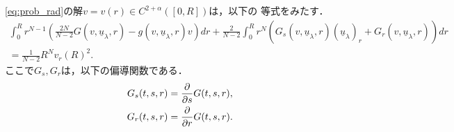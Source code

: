 \begin{lem}
 \eqref{eq:prob_rad}の解$v = v(r) \in C^{2+\alpha}([0, R])$は，以下の
 等式をみたす．
 \begin{multline}
  \int_0^R r^{N-1} \left( \frac{2N}{N-2} G(v, \underline{u}_\lambda,
  r) - g(v, \underline{u}_\lambda, r) v \right) dr
  + \frac{2}{N-2} \int_0^R r^N \left( G_s(v, \underline{u}_\lambda, r)
  (\underline{u}_\lambda)_r + G_r(v, \underline{u}_\lambda, r)
  \right) dr \\ = \frac{1}{N-2} R^N v_r(R)^2. \label{eq:poh_eq}
 \end{multline}
 ここで$G_s, G_r$は，以下の偏導関数である．
 \begin{align*}
  G_s(t, s, r) &= \frac{\partial }{\partial s} G(t, s, r), \\
  G_r(t, s, r) &= \frac{\partial }{\partial r} G(t, s, r).
 \end{align*}
\end{lem}

